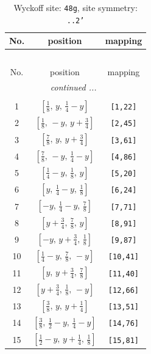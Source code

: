 \documentclass[fleqn,8pt]{jsarticle}
\begin{document}
\begin{longtable}{ccc}
\caption{Wyckoff site: {\tt 48g}, site symmetry: {\tt ..2'}}
 \\
 \hline \hline
No. & position & mapping \\ \hline \endfirsthead

\multicolumn{2}{l}{\tablename\ \thetable{}} \\
 \hline \hline
No. & position & mapping \\ \hline \endhead

 \hline \hline
\multicolumn{2}{r}{\footnotesize\it continued ...} \\ \endfoot

 \hline \hline
\multicolumn{2}{r}{} \\ \endlastfoot

1 & $\left[ \frac{1}{8},\, y,\, \frac{1}{4} - y \right]$ & {\tt [1,22]} \\ \hline
2 & $\left[ \frac{1}{8},\, - y,\, y + \frac{3}{4} \right]$ & {\tt [2,45]} \\ \hline
3 & $\left[ \frac{7}{8},\, y,\, y + \frac{3}{4} \right]$ & {\tt [3,61]} \\ \hline
4 & $\left[ \frac{7}{8},\, - y,\, \frac{1}{4} - y \right]$ & {\tt [4,86]} \\ \hline
5 & $\left[ \frac{1}{4} - y,\, \frac{1}{8},\, y \right]$ & {\tt [5,20]} \\ \hline
6 & $\left[ y,\, \frac{1}{4} - y,\, \frac{1}{8} \right]$ & {\tt [6,24]} \\ \hline
7 & $\left[ - y,\, \frac{1}{4} - y,\, \frac{7}{8} \right]$ & {\tt [7,71]} \\ \hline
8 & $\left[ y + \frac{3}{4},\, \frac{7}{8},\, y \right]$ & {\tt [8,91]} \\ \hline
9 & $\left[ - y,\, y + \frac{3}{4},\, \frac{1}{8} \right]$ & {\tt [9,87]} \\ \hline
10 & $\left[ \frac{1}{4} - y,\, \frac{7}{8},\, - y \right]$ & {\tt [10,41]} \\ \hline
11 & $\left[ y,\, y + \frac{3}{4},\, \frac{7}{8} \right]$ & {\tt [11,40]} \\ \hline
12 & $\left[ y + \frac{3}{4},\, \frac{1}{8},\, - y \right]$ & {\tt [12,66]} \\ \hline
13 & $\left[ \frac{3}{8},\, y,\, y + \frac{1}{4} \right]$ & {\tt [13,51]} \\ \hline
14 & $\left[ \frac{3}{8},\, \frac{1}{2} - y,\, \frac{1}{4} - y \right]$ & {\tt [14,76]} \\ \hline
15 & $\left[ \frac{1}{2} - y,\, y + \frac{1}{4},\, \frac{1}{8} \right]$ & {\tt [15,81]} \\ \hline

\end{longtable}
\end{document}
